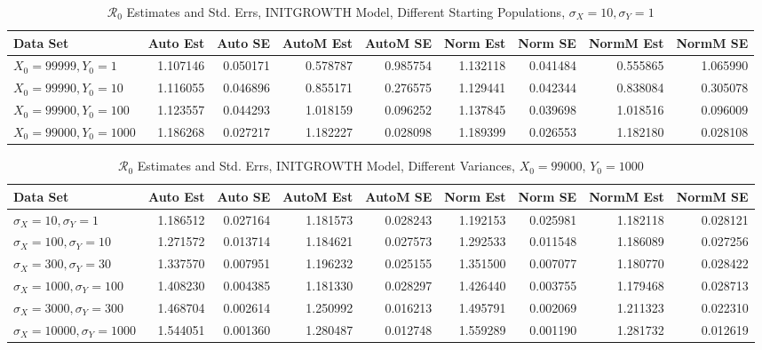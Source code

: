 \documentclass[12pt]{article}
\newcommand{\rr}{\ensuremath{\mathcal{R}_0}}
\begin{document}
\begin{table}[H]
	
	\caption{$\rr$ Estimates and Std. Errs, INITGROWTH Model,
		Different Starting Populations, 
		$\sigma_X = 10, \sigma_Y = 1$}
	\begin{footnotesize}
		\hskip -1.7cm
		\begin{tabular}{l|r|r|r|r|r|r|r|r}
			\hline
			Data Set & Auto Est & Auto SE & AutoM Est & AutoM SE & Norm Est & Norm SE & NormM Est & NormM SE\\
			\hline
			$X_0 = 99999, Y_0 = 1$ & 1.107146 & 0.050171 & 0.578787 & 0.985754 & 1.132118 & 0.041484 & 0.555865 & 1.065990\\
			\hline
			$X_0 = 99990, Y_0 = 10$ & 1.116055 & 0.046896 & 0.855171 & 0.276575 & 1.129441 & 0.042344 & 0.838084 & 0.305078\\
			\hline
			$X_0 = 99900, Y_0 = 100$ & 1.123557 & 0.044293 & 1.018159 & 0.096252 & 1.137845 & 0.039698 & 1.018516 & 0.096009\\
			\hline
			$X_0 = 99000, Y_0 = 1000$ & 1.186268 & 0.027217 & 1.182227 & 0.028098 & 1.189399 & 0.026553 & 1.182180 & 0.028108\\
			\hline
		\end{tabular}
	\end{footnotesize}
\end{table}

\begin{table}[H]
	
	\caption{$\rr$ Estimates and Std. Errs, INITGROWTH Model, 
		Different Variances, $X_0 = 99000$, $Y_0 = 1000$}
	\begin{footnotesize}
		\hskip -1.7cm
		\begin{tabular}{l|r|r|r|r|r|r|r|r}
			\hline
			Data Set & Auto Est & Auto SE & AutoM Est & AutoM SE & Norm Est & Norm SE & NormM Est & NormM SE\\
			\hline
			$\sigma_X = 10, \sigma_Y = 1$ & 1.186512 & 0.027164 & 1.181573 & 0.028243 & 1.192153 & 0.025981 & 1.182118 & 0.028121\\
			\hline
			$\sigma_X = 100, \sigma_Y = 10$ & 1.271572 & 0.013714 & 1.184621 & 0.027573 & 1.292533 & 0.011548 & 1.186089 & 0.027256\\
			\hline
			$\sigma_X = 300, \sigma_Y = 30$ & 1.337570 & 0.007951 & 1.196232 & 0.025155 & 1.351500 & 0.007077 & 1.180770 & 0.028422\\
			\hline
			$\sigma_X = 1000, \sigma_Y = 100$ & 1.408230 & 0.004385 & 1.181330 & 0.028297 & 1.426440 & 0.003755 & 1.179468 & 0.028713\\
			\hline
			$\sigma_X = 3000, \sigma_Y = 300$ & 1.468704 & 0.002614 & 1.250992 & 0.016213 & 1.495791 & 0.002069 & 1.211323 & 0.022310\\
			\hline
			$\sigma_X = 10000, \sigma_Y = 1000$ & 1.544051 & 0.001360 & 1.280487 & 0.012748 & 1.559289 & 0.001190 & 1.281732 & 0.012619\\
			\hline
			
		\end{tabular}
	\end{footnotesize}
\end{table}
\end{document}

